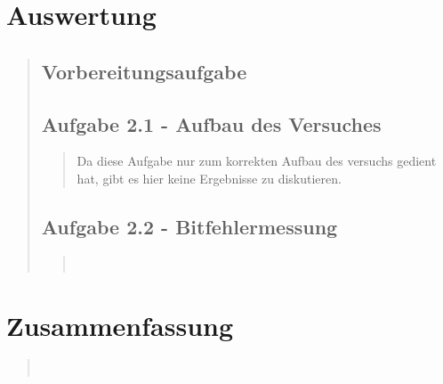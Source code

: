 \section{Auswertung}
\begin{quote}
    
    \subsection{Vorbereitungsaufgabe}
    \begin{quote}
        
    \end{quote}  %
    
    \subsection{Aufgabe 2.1 - Aufbau des Versuches}
    \begin{quote}
        
        Da diese Aufgabe nur zum korrekten Aufbau des versuchs gedient hat, gibt
        es hier keine Ergebnisse zu diskutieren.
        
    \end{quote}  %
    
    \subsection{Aufgabe 2.2 - Bitfehlermessung}
    \begin{quote}
         \\
    \end{quote}  %
            
\end{quote}%

    
\section{Zusammenfassung}
\begin{quote}

     \\
\end{quote}%
         

